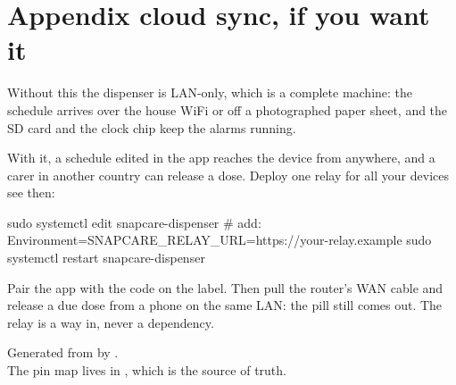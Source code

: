 \documentclass[11pt]{article}
\begin{document}
\section{Appendix \textemdash{} cloud sync, if you want it}

Without this the dispenser is LAN-only, which is a complete machine: the
schedule arrives over the house WiFi or off a photographed paper sheet, and the
SD card and the clock chip keep the alarms running.

With it, a schedule edited in the app reaches the device from anywhere, and a
carer in another country can release a dose. Deploy one relay for all your
devices \textemdash{} see  \textemdash{} then:

\begin{shell}
sudo systemctl edit snapcare-dispenser
# add: Environment=SNAPCARE_RELAY_URL=https://your-relay.example
sudo systemctl restart snapcare-dispenser
\end{shell}

\begin{provebox}
\provetitle
Pair the app with the code on the label. Then pull the router's WAN cable and
release a due dose from a phone on the same LAN: the pill still comes out. The
relay is a way in, never a dependency.
\end{provebox}

\vfill
\begin{center}\footnotesize\color{ink40}\sffamily
Generated from  by .\\
The pin map lives in , which is the source of truth.
\end{center}
\end{document}
